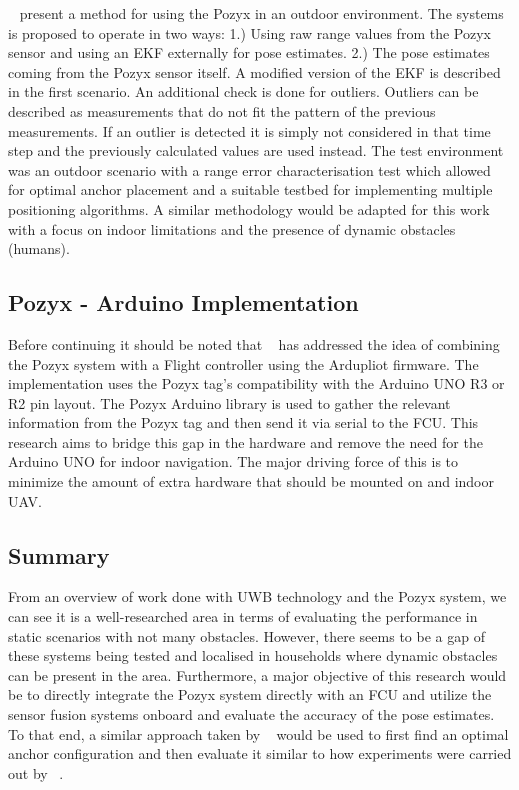 ~\citet{conceiccao2017robot} present a method for using the Pozyx in an outdoor environment.
The systems is proposed to operate in two ways: 1.) Using raw range values from the Pozyx sensor and using an EKF externally for pose estimates. 2.) The pose estimates coming from the Pozyx sensor itself.
A modified version of the EKF is described in the first scenario.
An additional check is done for outliers.
Outliers can be described as measurements that do not fit the pattern of the previous measurements.
If an outlier is detected it is simply not considered in that time step and the previously calculated values are used instead.
The test environment was an outdoor scenario with a range error characterisation test which allowed for optimal anchor placement and a suitable testbed for implementing multiple positioning algorithms.
A similar methodology would be adapted for this work with a focus on indoor limitations and the presence of dynamic obstacles (humans).



\subsection{Pozyx - Arduino Implementation}
Before continuing it should be noted that ~\citet{ardupilotarduino} has addressed the idea of combining the Pozyx system with a Flight controller using the Ardupliot firmware.
The implementation uses the Pozyx tag's compatibility with the Arduino UNO R3 or R2 pin layout.
The Pozyx Arduino library is used to gather the relevant information from the Pozyx tag and then send it via serial to the FCU.
This research aims to bridge this gap in the hardware and remove the need for the Arduino UNO for indoor navigation.
The major driving force of this is to minimize the amount of extra hardware that should be mounted on and indoor UAV.

\subsection{Summary}
From an overview of work done with UWB technology and the Pozyx system, we can see it is a well-researched area in terms of evaluating the performance in static scenarios with not many obstacles.
However, there seems to be a gap of these systems being tested and localised in households where dynamic obstacles can be present in the area.
Furthermore, a major objective of this research would be to directly integrate the Pozyx system directly with an FCU and utilize the sensor fusion systems onboard and evaluate the accuracy of the pose estimates.
To that end, a similar approach taken by ~\citet{di2019evaluation} would be used to first find an optimal anchor configuration and then evaluate it similar to how experiments were carried out by ~\citet{conceiccao2017robot}.